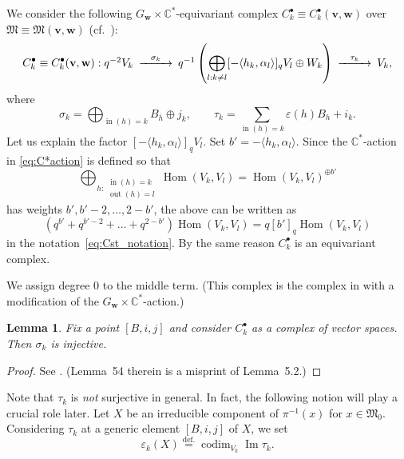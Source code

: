 \documentclass[12pt]{amsart}
\def\Bbb{\mathbb}
\def\frak{\mathfrak}
\newtheorem{Lemma}[equation]{Lemma}
\theoremstyle{definition}
\theoremstyle{remark}
\numberwithin{equation}{subsection}
\newcommand{\defeq}{\overset{\operatorname{\scriptstyle def.}}{=}}
\newcommand{\C}{{\Bbb C}}
\newcommand{\Hom}{\operatorname{Hom}}
\newcommand{\Ima}{\operatorname{Im}}
\newcommand{\vin}{\operatorname{in}} %
\newcommand{\vout}{\operatorname{out}} %
\newcommand{\M}{{\frak M}} %
\newcommand{\bv}{{\mathbf v}} %
\newcommand{\bw}{{\mathbf w}} %
\newcommand{\codim}{\operatorname{codim}} %
\begin{document}
We consider the following $G_\bw\times\C^*$-equivariant complex 
$C_k^\bullet \equiv C_k^\bullet(\bv,\bw)$ over 
$\M \equiv \M(\bv,\bw)$ (cf.\ \cite[4.2]{Na-alg}):
\begin{equation}\label{eq:taut_cpx}
C_k^\bullet \equiv C_k^\bullet(\bv,\bw):
\begin{CD}
  q^{-2} V_k
  @>{\sigma_k}>>
  q^{-1} \left( \displaystyle{\bigoplus_{l:k\neq l}}
     [-\langle h_k,\alpha_l\rangle]_q V_l
    \oplus W_k\right)
  @>{\tau_k}>>
  V_k,
\end{CD}
\end{equation}
where
\begin{equation*}
\sigma_k = \bigoplus_{\vin(h)=k} B_{\overline h} \oplus j_k, \qquad
\tau_k = \sum_{\vin(h)=k} \varepsilon(h) B_h + i_k.
\end{equation*}
Let us explain the factor $[-\langle h_k,\alpha_l\rangle]_q V_l$.
Set $b' = -\langle h_k,\alpha_l\rangle$.
Since the $\C^*$-action in \eqref{eq:C*action} is defined so that
\begin{equation*}
   \bigoplus_{h:\substack{\vin(h) = k\\ \vout(h)= l}} \Hom(V_k, V_l)
   = \Hom(V_k,V_l)^{\oplus b'}
\end{equation*}
has weights $b', b'-2, \dots, 2 - b'$, the above can be written as
\begin{equation*}
   \left(q^{b'} + q^{b'-2} + \dots + q^{2-b'}\right) \Hom(V_k,V_l)
   = q[b']_q \Hom(V_k,V_l)
\end{equation*}
in the notation~\eqref{eq:Cst_notation}. By the same reason
$C_k^\bullet$ is an equivariant complex.

We assign degree $0$ to the middle term. (This complex is 
the complex in \cite[4.2]{Na-alg} with a modification of the
$G_\bw\times\C^*$-action.)

\begin{Lemma}\label{lem:betasurj}
Fix a point $[B,i,j]$ and consider $C_k^\bullet$ as a complex 
of vector spaces. Then $\sigma_k$ is injective.
\end{Lemma}

\begin{proof}
See \cite[p.530]{Na-alg}. (Lemma~54 therein is a misprint of Lemma~5.2.)
\end{proof}

Note that $\tau_k$ is {\it not\/} surjective in general.
%
In fact, the following notion will play a crucial role later. Let $X$ be
an irreducible component of $\pi^{-1}(x)$ for $x\in\M_0$. Considering
$\tau_k$ at a generic element $[B,i,j]$ of $X$, we set
\begin{equation}\label{eq:epsilon_k}
   \varepsilon_k(X)
   \defeq \codim_{V_k} \Ima \tau_k.
\end{equation}
\end{document}
